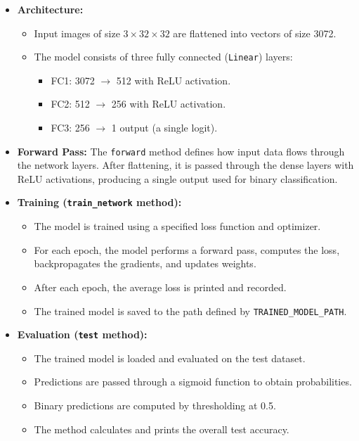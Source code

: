 \begin{itemize}
    \item \textbf{Architecture:}
    \begin{itemize}
        \item Input images of size $3 \times 32 \times 32$ are flattened into vectors of size 3072.
        \item The model consists of three fully connected (\texttt{Linear}) layers:
        \begin{itemize}
            \item FC1: 3072 $\rightarrow$ 512 with ReLU activation.
            \item FC2: 512 $\rightarrow$ 256 with ReLU activation.
            \item FC3: 256 $\rightarrow$ 1 output (a single logit).
        \end{itemize}
    \end{itemize}

    \item \textbf{Forward Pass:}
    The \texttt{forward} method defines how input data flows through the network layers. After flattening, it is passed through the dense layers with ReLU activations, producing a single output used for binary classification.

    \item \textbf{Training (\texttt{train\_network} method):}
    \begin{itemize}
        \item The model is trained using a specified loss function and optimizer.
        \item For each epoch, the model performs a forward pass, computes the loss, backpropagates the gradients, and updates weights.
        \item After each epoch, the average loss is printed and recorded.
        \item The trained model is saved to the path defined by \texttt{TRAINED\_MODEL\_PATH}.
    \end{itemize}

    \item \textbf{Evaluation (\texttt{test} method):}
    \begin{itemize}
        \item The trained model is loaded and evaluated on the test dataset.
        \item Predictions are passed through a sigmoid function to obtain probabilities.
        \item Binary predictions are computed by thresholding at 0.5.
        \item The method calculates and prints the overall test accuracy.
    \end{itemize}
\end{itemize}

